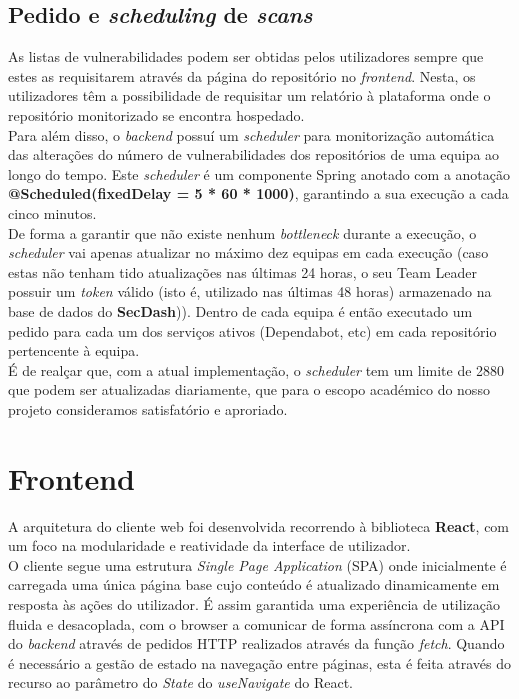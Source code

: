 \subsection{Pedido e \textit{scheduling} de \textit{scans}}
As listas de vulnerabilidades podem ser obtidas pelos utilizadores sempre que estes as requisitarem através da página do repositório no \textit{frontend}. Nesta, os utilizadores têm a possibilidade de requisitar um relatório à plataforma onde o repositório monitorizado se encontra hospedado. \\

Para além disso, o \textit{backend} possuí um \textit{scheduler} para monitorização automática das alterações do número de vulnerabilidades dos repositórios de uma equipa ao longo do tempo. Este \textit{scheduler} é um componente Spring anotado com a anotação \textbf{@Scheduled(fixedDelay = 5 * 60 * 1000)}, garantindo a sua execução a cada cinco minutos. \\

De forma a garantir que não existe nenhum \textit{bottleneck} durante a execução, o \textit{scheduler} vai apenas atualizar no máximo dez equipas em cada execução (caso estas não tenham tido atualizações nas últimas 24 horas, o seu Team Leader possuir um \textit{token} válido (isto é, utilizado nas últimas 48 horas) armazenado na base de dados do \textbf{SecDash})). Dentro de cada equipa é então executado um pedido para cada um dos serviços ativos (Dependabot, etc) em cada repositório pertencente à equipa. \\

É de realçar que, com a atual implementação, o \textit{scheduler} tem um limite de 2880 que podem ser atualizadas diariamente, que para o escopo académico do nosso projeto consideramos satisfatório e aproriado. \\

\section{Frontend} \label{implementacao:frontend}
A arquitetura do cliente web foi desenvolvida recorrendo à biblioteca \textbf{React}, com um foco na modularidade e reatividade da interface de utilizador. \\

O cliente segue uma estrutura \textit{Single Page Application} (SPA) onde inicialmente é carregada uma única página base cujo conteúdo é atualizado dinamicamente em resposta às ações do utilizador. É assim garantida uma experiência de utilização fluida e desacoplada, com o browser a comunicar de forma assíncrona com a API do \textit{backend} através de pedidos HTTP realizados através da função \textit{fetch}. Quando é necessário a gestão de estado na navegação entre páginas, esta é feita através do recurso ao parâmetro do \textit{State} do \textit{useNavigate} do React. \\

